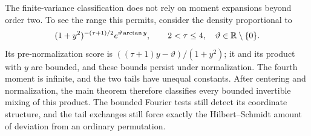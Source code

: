 The finite-variance classification does not rely on moment expansions
beyond order two. To see the range this permits, consider the density
proportional to
\[
 (1+y^2)^{-(\tau+1)/2}e^{\vartheta\arctan y},\qquad
 2<\tau\le4,\quad\vartheta\in\mathbb R\setminus\{0\}.
\]
Its pre-normalization score is \(((\tau+1)y-\vartheta)/(1+y^2)\); it and its
product with \(y\) are bounded, and these bounds persist under normalization.
The fourth moment is infinite, and the two tails have
unequal constants. After centering and normalization, the main theorem
therefore classifies every bounded invertible mixing of this product.
The bounded Fourier tests still detect its coordinate structure, and the
tail exchanges still force exactly the Hilbert--Schmidt amount of deviation
from an ordinary permutation.
